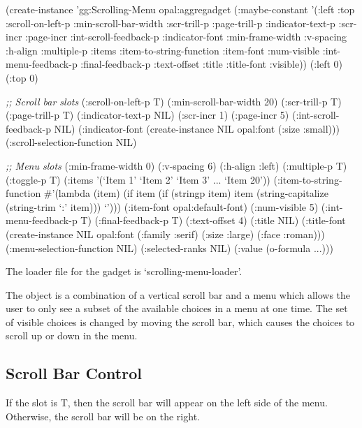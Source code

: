 \begin{programexample}
\begin{group}

(create-instance 'gg:Scrolling-Menu opal:aggregadget
   (:maybe-constant '(:left :top :scroll-on-left-p :min-scroll-bar-width :scr-trill-p
                      :page-trill-p :indicator-text-p :scr-incr :page-incr
                      :int-scroll-feedback-p :indicator-font :min-frame-width :v-spacing
                      :h-align :multiple-p :items :item-to-string-function :item-font
                      :num-visible :int-menu-feedback-p :final-feedback-p :text-offset
                      :title :title-font :visible))
   (:left 0) (:top 0)

   {\it ;; Scroll bar slots}
   (:scroll-on-left-p T)
   (:min-scroll-bar-width 20)
   (:scr-trill-p T)
   (:page-trill-p T)
   (:indicator-text-p NIL)
   (:scr-incr 1)
   (:page-incr 5)
   (:int-scroll-feedback-p NIL)
   (:indicator-font (create-instance NIL opal:font (:size :small)))
   (:scroll-selection-function NIL)

   {\it ;; Menu slots}
   (:min-frame-width 0)
   (:v-spacing 6)
   (:h-align :left)
   (:multiple-p T)
   (:toggle-p T)
   (:items '(`Item 1' `Item 2' `Item 3' ... `Item 20'))
   (:item-to-string-function
       \#'(lambda (item)
           (if item
               (if (stringp item)
                   item
                   (string-capitalize (string-trim `:' item)))
               `')))
   (:item-font opal:default-font)
   (:num-visible 5)
   (:int-menu-feedback-p T)
   (:final-feedback-p T)
   (:text-offset 4)
   (:title NIL)
   (:title-font (create-instance NIL opal:font
		   (:family :serif)
		   (:size :large)
		   (:face :roman)))
   (:menu-selection-function NIL)
   (:selected-ranks NIL)
   (:value (o-formula ...)))
\end{group}
\end{programexample}

The loader file for the  gadget is `scrolling-menu-loader'.

The  object is a combination of a vertical scroll
bar and a menu which allows the user to only see a subset of the
available choices in a menu at one time.  The set of visible choices
is changed by moving the scroll bar, which causes the choices to
scroll up or down in the menu.

\subsection{Scroll Bar Control} If the slot  is
T, then the scroll bar will appear on the left side of the menu.
Otherwise, the scroll bar will be on the right.

